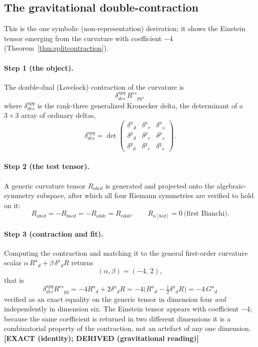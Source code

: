 \documentclass[11pt,oneside]{book}
\newcommand{\status}[1]{{\sffamily\bfseries\color{statuscol}[#1]}}
\theoremstyle{plain}
\theoremstyle{definition}
\theoremstyle{remark}
\begin{document}
\subsection{The gravitational double-contraction}
\label{wd:gravity}
This is the one symbolic (non-representation) derivation; it shows the Einstein tensor
emerging from the curvature with coefficient $-4$ (Theorem~\ref{thm:splitcontraction}).

\paragraph{Step 1 (the object).}
The double-dual (Lovelock) contraction of the curvature is
\[
  \delta^{apq}_{drs}\,R^{rs}{}_{pq},
\]
where $\delta^{apq}_{drs}$ is the rank-three generalized Kronecker delta, the
determinant of a $3\times3$ array of ordinary deltas,
\[
  \delta^{apq}_{drs}
  =\det\!\begin{pmatrix}
     \delta^a{}_d & \delta^a{}_r & \delta^a{}_s\\[1pt]
     \delta^p{}_d & \delta^p{}_r & \delta^p{}_s\\[1pt]
     \delta^q{}_d & \delta^q{}_r & \delta^q{}_s
   \end{pmatrix}.
\]

\paragraph{Step 2 (the test tensor).}
A generic curvature tensor $R_{abcd}$ is generated and projected onto the
algebraic-symmetry subspace, after which all four Riemann symmetries are verified to
hold on it:
\[
  R_{abcd}=-R_{bacd}=-R_{abdc}=R_{cdab},\qquad
  R_{a[bcd]}=0\ \text{(first Bianchi)} .
\]

\paragraph{Step 3 (contraction and fit).}
Computing the contraction and matching it to the general first-order curvature scalar
$\alpha\,R^a{}_d+\beta\,\delta^a{}_d R$ returns
\[
  (\alpha,\beta)=(-4,\,2),
\]
that is
\[
  \boxed{\;\delta^{apq}_{drs}R^{rs}{}_{pq}
        =-4R^a{}_d+2\delta^a{}_d R
        =-4\bigl(R^a{}_d-\tfrac12\delta^a{}_d R\bigr)
        =-4\,G^a{}_d\;}
\]
verified as an exact equality on the generic tensor in dimension four \emph{and}
independently in dimension six. The Einstein tensor appears with coefficient $-4$;
because the same coefficient is returned in two different dimensions it is a
combinatorial property of the contraction, not an artefact of any one dimension.
\status{EXACT (identity); DERIVED (gravitational reading)}
\end{document}
